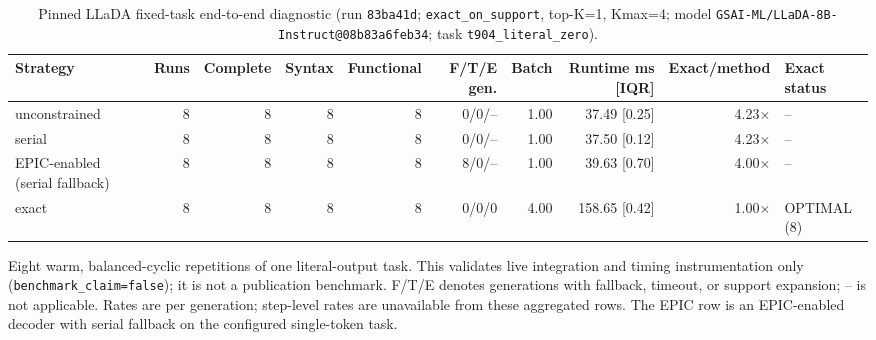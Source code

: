 \begin{table}[t]
\centering
\caption{Pinned LLaDA fixed-task end-to-end diagnostic (run \texttt{83ba41d}; \texttt{exact\_on\_support}, top-K=1, Kmax=4; model \texttt{GSAI-ML/LLaDA-8B-Instruct@08b83a6feb34}; task \texttt{t904\_literal\_zero}).}
\label{tab:mwpc-end-to-end}
\scriptsize
\begin{tabular}{lrrrrrrrrl}
\toprule
Strategy & Runs & Complete & Syntax & Functional & F/T/E gen. & Batch & Runtime ms [IQR] & Exact/method & Exact status \\
\midrule
unconstrained & 8 & 8 & 8 & 8 & 0/0/-- & 1.00 & 37.49 [0.25] & 4.23$\times$ & -- \\
serial & 8 & 8 & 8 & 8 & 0/0/-- & 1.00 & 37.50 [0.12] & 4.23$\times$ & -- \\
EPIC-enabled (serial fallback) & 8 & 8 & 8 & 8 & 8/0/-- & 1.00 & 39.63 [0.70] & 4.00$\times$ & -- \\
exact & 8 & 8 & 8 & 8 & 0/0/0 & 4.00 & 158.65 [0.42] & 1.00$\times$ & OPTIMAL (8) \\
\bottomrule
\end{tabular}
\par\footnotesize Eight warm, balanced-cyclic repetitions of one literal-output task. This validates live integration and timing instrumentation only (\texttt{benchmark\_claim=false}); it is not a publication benchmark. F/T/E denotes generations with fallback, timeout, or support expansion; -- is not applicable. Rates are per generation; step-level rates are unavailable from these aggregated rows. The EPIC row is an EPIC-enabled decoder with serial fallback on the configured single-token task.
\end{table}
